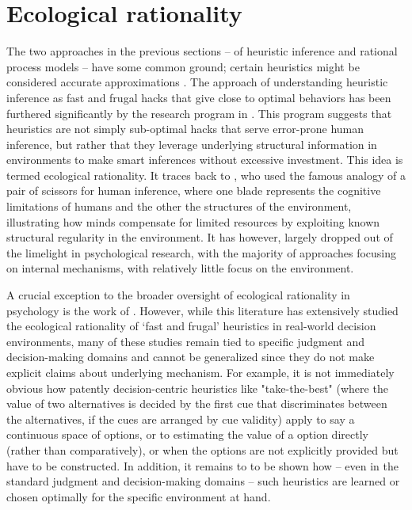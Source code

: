 \section{Ecological rationality}

The two approaches in the previous sections -- of heuristic inference and rational process models -- have some common ground; certain heuristics might be considered accurate approximations \citep{gigerenzer2009homo, parpart2018heuristics, belousov2016catching}. The approach of understanding heuristic inference as fast and frugal hacks that give close to optimal behaviors has been furthered significantly by the research program in \citet{gigerenzer2011heuristic}. This program suggests that heuristics are not simply sub-optimal hacks that serve error-prone human inference, but rather that they leverage underlying structural information in environments to make smart inferences without excessive investment. This idea is termed ecological rationality. It traces back to \citet{simon1955behavioral}, who used the famous analogy of a pair of scissors for human inference, where one blade represents the cognitive limitations of humans and the other the structures of the environment, illustrating how minds compensate for limited resources by exploiting known structural regularity in the environment. It has however, largely dropped out of the limelight in psychological research, with the majority of approaches focusing on internal mechanisms, with relatively little focus on the environment.

A crucial exception to the broader oversight of ecological rationality in psychology is the work of \citep{gigerenzer2008heuristics}. However, while this literature has extensively studied the ecological rationality of `fast and frugal' heuristics in real-world decision environments, many of these studies remain tied to specific judgment and decision-making domains and cannot be generalized since they do not make explicit claims about underlying mechanism. For example, it is not immediately obvious how patently decision-centric heuristics like "take-the-best" (where the value of two alternatives is decided by the first cue that discriminates between the alternatives, if the cues are arranged by cue validity) apply to say a continuous space of options, or to estimating the value of a option directly (rather than comparatively), or when the options are not explicitly provided but have to be constructed. In addition, it remains to to be shown how -- even in the standard judgment and decision-making domains -- such heuristics are learned or chosen optimally for the specific environment at hand. 

